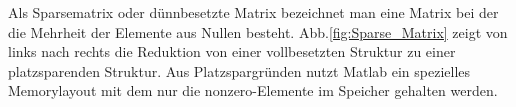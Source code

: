 

Als Sparsematrix oder dünnbesetzte Matrix bezeichnet man eine
Matrix bei der die Mehrheit der Elemente aus Nullen besteht.
Abb.\ref{fig:Sparse_Matrix} zeigt von links
nach rechts die Reduktion von einer vollbesetzten Struktur
zu einer platzsparenden Struktur.
Aus Platzspargründen nutzt Matlab ein spezielles Memorylayout \cite{matlabsparse}
mit dem nur die nonzero-Elemente im Speicher gehalten werden.



